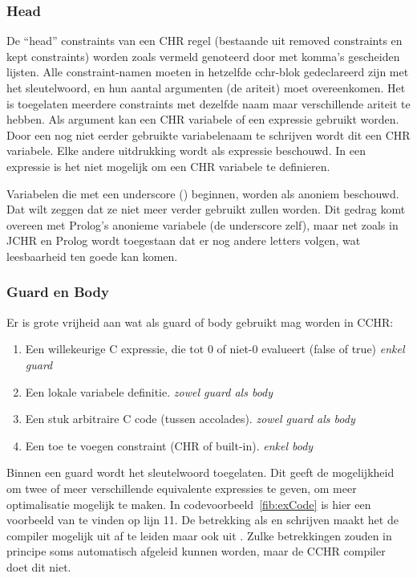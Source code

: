 \subsubsection{Head}

De ``head'' constraints van een CHR regel (bestaande uit removed constraints en kept constraints) worden zoals vermeld genoteerd door met komma's gescheiden lijsten. Alle constraint-namen moeten in hetzelfde cchr-blok gedeclareerd zijn met het  sleutelwoord, en hun aantal argumenten (de ariteit) moet overeenkomen. Het is toegelaten meerdere constraints met dezelfde naam maar verschillende ariteit te hebben. Als argument kan een CHR variabele of een expressie gebruikt worden. Door een nog niet eerder gebruikte variabelenaam te schrijven wordt dit een CHR variabele. Elke andere uitdrukking wordt als expressie beschouwd. In een expressie is het niet mogelijk om een CHR variabele te definieren.

Variabelen die met een underscore (\code{\_}) beginnen, worden als anoniem beschouwd. Dat wilt zeggen dat ze niet meer verder gebruikt zullen worden. Dit gedrag komt overeen met Prolog's anonieme variabele (de underscore zelf), maar net zoals in JCHR en Prolog wordt toegestaan dat er nog andere letters volgen, wat leesbaarheid ten goede kan komen.

\subsubsection{Guard en Body}

Er is grote vrijheid aan wat als guard of body gebruikt mag worden in CCHR: \begin{enumerate}
  \item Een willekeurige C expressie, die tot 0 of niet-0 evalueert (false of true) \em{enkel guard}
  \item Een lokale variabele definitie. \em{zowel guard als body}
  \item Een stuk arbitraire C code (tussen accolades). \em{zowel guard als body}
  \item Een toe te voegen constraint (CHR of built-in). \em{enkel body}
\end{enumerate}

Binnen een guard wordt het sleutelwoord  toegelaten. Dit geeft de mogelijkheid om twee of meer verschillende equivalente expressies te geven, om meer optimalisatie mogelijk te maken. In codevoorbeeld~\ref{fib:exCode} is hier een voorbeeld van te vinden op lijn 11. De betrekking als  en  schrijven maakt het de compiler mogelijk  uit  af te leiden maar ook  uit . Zulke betrekkingen zouden in principe soms automatisch afgeleid kunnen worden, maar de CCHR compiler doet dit niet.

